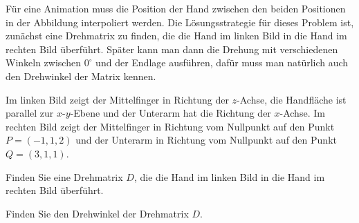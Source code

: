 Für eine Animation muss die Position der Hand zwischen den beiden
Positionen in der Abbildung interpoliert werden.
Die Lösungsstrategie für dieses Problem ist, zunächst eine Drehmatrix
zu finden, die die Hand im linken Bild in die Hand im rechten Bild überführt.
Später kann man dann die Drehung mit verschiedenen Winkeln zwischen $0^\circ$
und der Endlage ausführen, dafür muss man natürlich auch den Drehwinkel
der Matrix kennen.
\begin{center}
\end{center}
Im linken Bild zeigt der Mittelfinger in Richtung der $z$-Achse,
die Handfläche ist parallel zur $x$-$y$-Ebene und der Unterarm hat die
Richtung der $x$-Achse.
Im rechten Bild zeigt der Mittelfinger in Richtung vom Nullpunkt auf
den Punkt $P=(-1,1,2)$ und der Unterarm in Richtung vom Nullpunkt auf
den Punkt $Q=(3,1,1)$.

\begin{teilaufgaben}
\item
Finden Sie eine Drehmatrix $D$, die die Hand im linken Bild in die Hand im
rechten Bild überführt.
\item
Finden Sie den Drehwinkel der Drehmatrix $D$.
\end{teilaufgaben}

